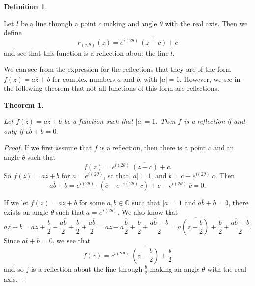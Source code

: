 \documentclass[
]{book}
\newtheorem{theorem}{Theorem}[chapter]
\theoremstyle{definition}
\newtheorem{definition}{Definition}[chapter]
\theoremstyle{definition}
\theoremstyle{definition}
\theoremstyle{definition}
\theoremstyle{remark}
\begin{document}
\begin{definition}
\protect\hypertarget{def:unlabeled-div-276}{}\label{def:unlabeled-div-276}

Let \(l\) be a line through a point \(c\) making and angle \(\theta\) with the real axis. Then we define \[r_{(c,\theta)}(z)= e^{i(2\theta )} \: \overline{(z-c)} +c\] and see that this function is a reflection about the line \(l\).

\end{definition}

We can see from the expression for the reflections that they are of the form \(f(z)=a \overline{z}+b\) for complex numbers \(a\) and \(b\), with \(|a|=1\). However, we see in the following theorem that not all functions of this form are reflections.

\begin{theorem}
\protect\hypertarget{thm:complex-reflection}{}\label{thm:complex-reflection}

Let \(f(z)=a\overline{z} + b\) be a function such that \(|a|=1\). Then \(f\) is a reflection if and only if \(a\overline{b}+b=0\).

\end{theorem}

\begin{proof}

If we first assume that \(f\) is a reflection, then there is a point \(c\) and an angle \(\theta\) such that \[f(z) = e^{i(2\theta)} \: \overline{(z-c)} +c.\] So \(f(z)=a\overline{z} +b\) for \(a=e^{i(2\theta)}\), so that \(|a|=1\), and \(b= c-e^{i(2\theta)} \: \overline{c}\). Then \[a\overline{b} + b = e^{i(2\theta)} \cdot \left(\overline{c}-e^{-i(2\theta)} \: c\right) + c-e^{i(2\theta)}\: \overline{c}=0.\]

If we let \(f(z)=a\overline{z}+b\) for some \(a,b\in \mathbb{C}\) such that \(|a|=1\) and \(a\overline{b}+b=0\), there exists an angle \(\theta\) such that \(a= e^{i(2\theta)}\). We also know that \[a\overline{z}+b= a\overline{z} + \frac{b}{2}-\frac{a\overline{b}}{2} + \frac{b}{2} + \frac{a\overline{b}}{2} = a \overline{z} - a \frac{\overline{b}}{2} + \frac{b}{2} + \frac{a\overline{b}+b}{2} = a \overline{\left(z-\frac{b}{2}\right)} + \frac{b}{2} + \frac{a\overline{b}+b}{2}.\] Since \(a\overline{b}+b=0\), we see that
\[f(z)=e^{i(2\theta)}\; \overline{\left(z-\frac{b}{2}\right)} + \frac{b}{2}\] and so \(f\) is a reflection about the line through \(\frac{b}{2}\) making an angle \(\theta\) with the real axis.

\end{proof}
\end{document}
